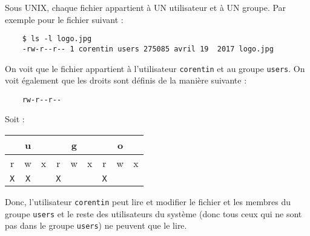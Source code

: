 \documentclass[10pt]{article}
\begin{document}
Sous UNIX, chaque fichier appartient à UN utilisateur et à UN
groupe. Par exemple pour le fichier suivant :

\begin{verbatim}
    $ ls -l logo.jpg
    -rw-r--r-- 1 corentin users 275085 avril 19  2017 logo.jpg
\end{verbatim}

On voit que le fichier appartient à l'utilisateur {\tt corentin} et au
groupe {\tt users}. On voit également que les droits sont définis de
la manière suivante :

\begin{verbatim}
    rw-r--r--
\end{verbatim}

Soit :

\begin{center}
  \begin{tabular}{|c|c|c|c|c|c|c|c|c|}
    \hline
    \multicolumn{3}{|c|}{u} & \multicolumn{3}{c|}{g} & \multicolumn{3}{c|}{o} \\
    \hline
    r & w & x & r & w & x & r & w & x \\
    \hline
    {\tt X} & {\tt X} &  & {\tt X} &  &  & {\tt X} &  &  \\
    \hline
  \end{tabular}
\end{center}

Donc, l'utilisateur {\tt corentin} peut lire et modifier le fichier et
les membres du groupe {\tt users} et le reste des utilisateurs du
système (donc tous ceux qui ne sont pas dans le groupe {\tt users}) ne
peuvent que le lire.
\end{document}
